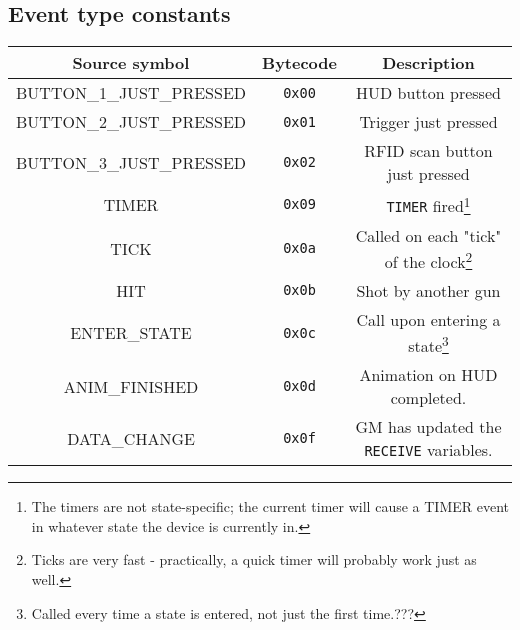 \documentclass[12pt,a4paper]{scrbook}
\begin{document}
\subsection{Event type constants}
\label{sec:eventtypeconsts}
\begin{minipage}{\linewidth}
\begin{center}
  \begin{tabular}{ | c | c || c | }
    \hline
    Source symbol & Bytecode & Description \\ \hline \hline
    BUTTON\_1\_JUST\_PRESSED	& \texttt{0x00} & HUD button pressed  \\ \hline
    BUTTON\_2\_JUST\_PRESSED 	& \texttt{0x01} & Trigger just pressed  \\ \hline
    BUTTON\_3\_JUST\_PRESSED 	& \texttt{0x02} & RFID scan button just pressed  \\ \hline
    TIMER					 	& \texttt{0x09} & \texttt{TIMER} fired\footnote{
    					The timers are not state-specific; the current timer will cause a TIMER event
    					in whatever state the device is currently in.}  \\ \hline
    TICK					 	& \texttt{0x0a} & Called on each "tick" of the clock\footnote{ 
    					Ticks are very fast - practically, a quick timer will probably work just 
    					as well.}  \\ \hline
    HIT						 	& \texttt{0x0b} & Shot by another gun  \\ \hline
    ENTER\_STATE			 	& \texttt{0x0c} & Call upon entering a state\footnote{ 
    					Called every time a state is entered, not just the first time.???} \\ \hline
    ANIM\_FINISHED			 	& \texttt{0x0d} & Animation on HUD completed.  \\ \hline
    DATA\_CHANGE 				& \texttt{0x0f} & GM has updated the \texttt{RECEIVE} variables.  
    					\\ \hline
  \end{tabular}
\end{center}
\end{minipage}

\end{document}
